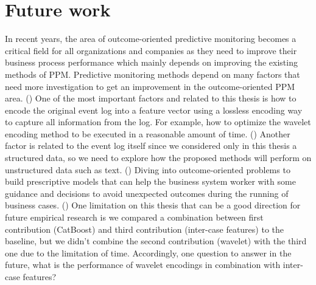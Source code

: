 \section{Future work}
In recent years, the area of outcome-oriented predictive monitoring becomes a critical field for all organizations and companies as they need to improve their business process performance which mainly depends on improving the existing methods of PPM.  Predictive monitoring methods depend on many factors that need more investigation to get an improvement in the outcome-oriented PPM area. () One of the most important factors and related to this thesis is how to encode the original event log into a feature vector using a lossless encoding way to capture all information from the log. For example, how to optimize the wavelet encoding method to be executed in a reasonable amount of time.  () Another factor is related to the event log itself since we considered only in this thesis a structured data, so we need to explore how the proposed methods will perform on unstructured data such as text. () Diving into outcome-oriented problems to build prescriptive models that can help the business system worker with some guidance and decisions to avoid unexpected outcomes during the running of business cases. () One limitation on this thesis that can be a good direction for future empirical research is we compared a combination between first contribution (CatBoost) and third contribution (inter-case features) to the baseline, but we didn't combine the second contribution (wavelet) with the third one due to the limitation of time. Accordingly, one question to answer in the future, what is the performance of wavelet encodings in combination with inter-case features?



